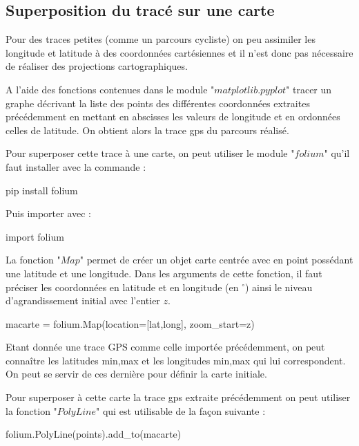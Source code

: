 \subsection*{Superposition du tracé sur une carte}

Pour des traces petites (comme un parcours cycliste) on peu assimiler les longitude et latitude à des coordonnées cartésiennes et il n'est donc pas nécessaire de réaliser des projections cartographiques.

\question{} A l'aide des fonctions contenues dans le module "$matplotlib.pyplot$" tracer un graphe décrivant la liste des points des différentes coordonnées extraites précédemment en mettant en abscisses les valeurs de longitude et en ordonnées celles de latitude. On obtient alors la trace gps du parcours réalisé.



Pour superposer cette trace à une carte, on peut utiliser le module "$folium$" qu'il faut installer avec la commande : 

\begin{pyverbatim}
pip install folium
\end{pyverbatim}

Puis importer avec :

\begin{pyverbatim}
import folium
\end{pyverbatim}

La fonction "$Map$" permet de créer un objet carte centrée avec en point possédant une latitude et une longitude. Dans les arguments de cette fonction, il faut préciser les coordonnées en latitude et en longitude (en $^{\circ}$) ainsi le niveau d'agrandissement initial avec l'entier $z$.

\begin{pyverbatim}
macarte = folium.Map(location=[lat,long], zoom_start=z)
\end{pyverbatim}

Etant donnée une trace GPS comme celle importée précédemment, on peut connaître les latitudes min,max et les longitudes min,max qui lui correspondent. On peut se servir de ces dernière pour définir la carte initiale.

Pour superposer à cette carte la trace gps extraite précédemment on peut utiliser la fonction "$PolyLine$" qui est utilisable de la façon suivante : 

\begin{pyverbatim}
folium.PolyLine(points).add_to(macarte)
\end{pyverbatim}

